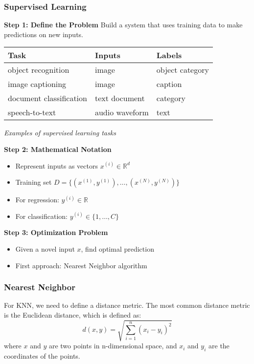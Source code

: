 \documentclass{article}
\begin{document}
\subsubsection*{Supervised Learning}

\begin{tcolorbox}[colback=gray!10!white,colframe=navyblue!70!black,title=Supervised Learning: Step-by-Step]

\textbf{Step 1: Define the Problem}
Build a system that uses training data to make predictions on new inputs.

\centering
\begin{tabular}{|l|l|l|}
\hline
\textbf{Task} & \textbf{Inputs} & \textbf{Labels} \\
\hline
object recognition & image & object category \\
image captioning & image & caption \\
document classification & text document & category \\
speech-to-text & audio waveform & text \\
\hline
\end{tabular}
\par\smallskip
\textit{Examples of supervised learning tasks}
\par
\raggedright

\textbf{Step 2: Mathematical Notation}
\begin{itemize}
  \item Represent inputs as vectors $x^{(i)} \in \mathbb{R}^d$
  \item Training set $D = \{(x^{(1)}, y^{(1)}), \ldots, (x^{(N)}, y^{(N)})\}$
  \item For regression: $y^{(i)} \in \mathbb{R}$
  \item For classification: $y^{(i)} \in \{1,\ldots,C\}$
\end{itemize}

\textbf{Step 3: Optimization Problem}
\begin{itemize}
  \item Given a novel input $x$, find optimal prediction
  \item First approach: Nearest Neighbor algorithm
\end{itemize}

\end{tcolorbox}

\subsubsection*{Nearest Neighbor}
For KNN, we need to define a distance metric. The most common distance metric is the Euclidean distance, which is defined as:
\begin{equation}
d(x, y) = \sqrt{\sum_{i=1}^{n} (x_i - y_i)^2}
\end{equation}
where $x$ and $y$ are two points in n-dimensional space, and $x_i$ and $y_i$ are the coordinates of the points.

\end{document}
